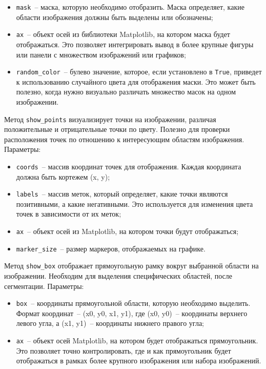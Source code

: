 \begin{itemize}
    \item \lstinline{mask}~-- маска, которую необходимо отобразить. Маска определяет, какие области изображения должны быть выделены или обозначены;
    \item \lstinline{ax}~-- объект осей из библиотеки Matplotlib, на котором маска будет отображаться. Это позволяет интегрировать вывод в более крупные фигуры или панели с множеством изображений или графиков;
    \item \lstinline{random_color}~-- булево значение, которое, если установлено в \lstinline{True}, приведет к использованию случайного цвета для отображения маски. Это может быть полезно, когда нужно визуально различать множество масок на одном изображении.
\end{itemize}

Метод \lstinline{show_points} визуализирует точки на изображении, различая положительные и отрицательные точки по цвету. Полезно для проверки расположения точек по отношению к интересующим областям изображения. Параметры:

\begin{itemize}
    \item \lstinline{coords}~-- массив координат точек для отображения. Каждая координата должна быть кортежем (x, y);
    \item \lstinline{labels}~-- массив меток, который определяет, какие точки являются позитивными, а какие негативными. Это используется для изменения цвета точек в зависимости от их меток;
    \item \lstinline{ax}~-- объект осей из Matplotlib, на котором точки будут отображаться;
    \item \lstinline{marker_size}~-- размер маркеров, отображаемых на графике.
\end{itemize}


Метод \lstinline{show_box} отображает прямоугольную рамку вокруг выбранной области на изображении. Необходим для выделения специфических областей, после сегментации. Параметры:

\begin{itemize}
    \item \lstinline{box}~-- координаты прямоугольной области, которую необходимо выделить. Формат координат~-- (x0, y0, x1, y1), где (x0, y0)~-- координаты верхнего левого угла, а (x1, y1)~-- координаты нижнего правого угла;
    \item \lstinline{ax}~-- объект осей Matplotlib, на котором будет отображаться прямоугольник. Это позволяет точно контролировать, где и как прямоугольник будет отображаться в рамках более крупного изображения или набора изображений.
\end{itemize}

